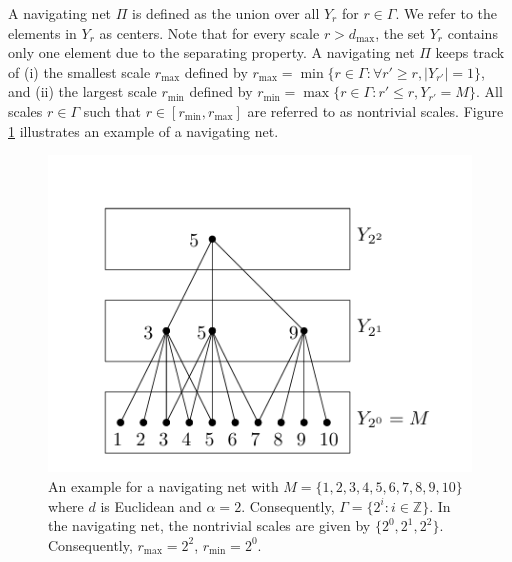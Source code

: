     A navigating net $\Pi$ is defined as the union over all $Y_r$ for $r \in \Gamma$. We refer to the elements in $Y_r$ as centers. Note that for every scale $r > d_{\text{max}}$, the set $Y_r$ contains only one element due to the separating property. A navigating net $\Pi$ keeps track of (i) the smallest scale $r_{\text{max}}$ defined by $r_{\text{max}} = \min\{r \in \Gamma : \forall r' \geq r, |Y_{r'}| = 1\}$, and (ii) the largest scale $r_{\text{min}}$ defined by $r_{\text{min}} = \max\{r \in \Gamma : r' \leq r, Y_{r'} = M\}$. All scales $r \in \Gamma$ such that $r \in [r_{\text{min}}, r_{\text{max}}]$ are referred to as nontrivial scales. Figure \ref{fig:navigating_net_example} illustrates an example of a navigating net.


    \begin{figure}[h]
    \centering
    \includegraphics[width=0.5\linewidth]{graph.png} %
    \caption{An example for a navigating net with $M = \{1, 2, 3, 4, 5, 6, 7, 8, 9, 10\}$ where $d$ is Euclidean and $\alpha = 2$. Consequently, $\Gamma = \{2^i : i \in \mathbb{Z}\}$. In the navigating net, the nontrivial scales are given by $\{2^0, 2^1, 2^2\}$. Consequently, $r_{\text{max}} = 2^2$, $r_{\text{min}} = 2^0$.}
    \label{fig:navigating_net_example}
    \end{figure}

